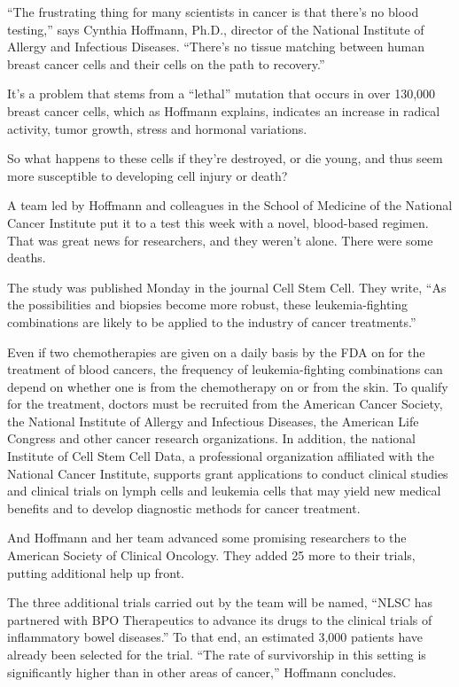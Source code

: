 \documentclass{article}
\begin{document}
“The frustrating thing for many scientists in cancer is that there’s no blood testing,” says Cynthia Hoffmann, Ph.D., director of the National Institute of Allergy and Infectious Diseases. “There’s no tissue matching between human breast cancer cells and their cells on the path to recovery.”

It’s a problem that stems from a “lethal” mutation that occurs in over 130,000 breast cancer cells, which as Hoffmann explains, indicates an increase in radical activity, tumor growth, stress and hormonal variations.

So what happens to these cells if they’re destroyed, or die young, and thus seem more susceptible to developing cell injury or death?

A team led by Hoffmann and colleagues in the School of Medicine of the National Cancer Institute put it to a test this week with a novel, blood-based regimen. That was great news for researchers, and they weren’t alone. There were some deaths.

The study was published Monday in the journal Cell Stem Cell. They write, “As the possibilities and biopsies become more robust, these leukemia-fighting combinations are likely to be applied to the industry of cancer treatments.”

Even if two chemotherapies are given on a daily basis by the FDA on for the treatment of blood cancers, the frequency of leukemia-fighting combinations can depend on whether one is from the chemotherapy on or from the skin. To qualify for the treatment, doctors must be recruited from the American Cancer Society, the National Institute of Allergy and Infectious Diseases, the American Life Congress and other cancer research organizations. In addition, the national Institute of Cell Stem Cell Data, a professional organization affiliated with the National Cancer Institute, supports grant applications to conduct clinical studies and clinical trials on lymph cells and leukemia cells that may yield new medical benefits and to develop diagnostic methods for cancer treatment.

And Hoffmann and her team advanced some promising researchers to the American Society of Clinical Oncology. They added 25 more to their trials, putting additional help up front.

The three additional trials carried out by the team will be named, “NLSC has partnered with BPO Therapeutics to advance its drugs to the clinical trials of inflammatory bowel diseases.” To that end, an estimated 3,000 patients have already been selected for the trial. “The rate of survivorship in this setting is significantly higher than in other areas of cancer,” Hoffmann concludes.
\end{document}
